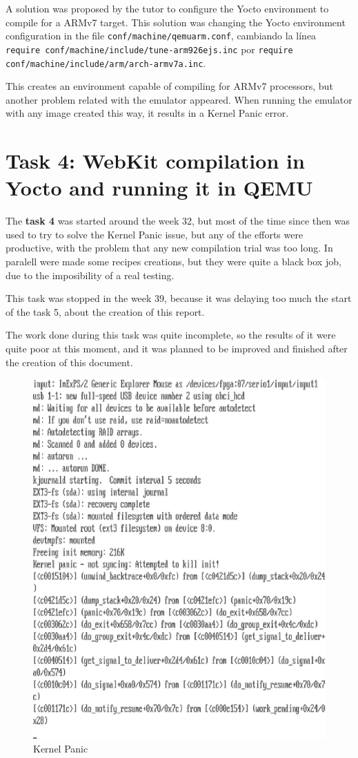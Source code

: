 \documentclass[a4paper,11pt,openany]{report}
\begin{document}
A solution was proposed by the tutor to configure the Yocto environment to compile for a ARMv7 target. This solution was changing the Yocto environment configuration in the file \verb#conf/machine/qemuarm.conf#, cambiando la línea \verb#require conf/machine/include/tune-arm926ejs.inc# por \verb#require conf/machine/include/arm/arch-armv7a.inc#.

This creates an environment capable of compiling for ARMv7 processors, but another problem related with the emulator appeared. When running the emulator with any image created this way, it results in a Kernel Panic error.

\section{Task 4: WebKit compilation in Yocto and running it in QEMU}
The \textbf{task 4} was started around the week 32, but most of the time since then was used to try to solve the Kernel Panic issue, but any of the efforts were productive, with the problem that any new compilation trial was too long. In paralell were made some recipes creations, but they were quite a black box job, due to the imposibility of a real testing.

This task was stopped in the week 39, because it was delaying too much the start of the task 5, about the creation of this report.

The work done during this task was quite incomplete, so the results of it were quite poor at this moment, and it was planned to be improved and finished after the creation of this document.

\begin{figure}[hbtp]
\centering
\includegraphics[scale=1]{kernel_panic.eps}
\caption{Kernel Panic}
\end{figure}
\end{document}
